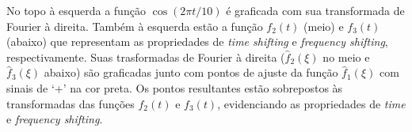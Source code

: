 No topo à esquerda a função $\cos(2 \pi t/10)$ é graficada com sua transformada de Fourier à direita. Também à esquerda estão a função $f_{2}(t)$ (meio) e $f_{3}(t)$ (abaixo) que representam as propriedades de \textit{time shifting} e \textit{frequency shifting}, respectivamente. Suas trasformadas de Fourier à direita ($\hat{f}_{2}(\xi)$ no meio e $\hat{f}_{3}(\xi)$ abaixo) são graficadas junto com pontos de ajuste da função $\hat{f}_{1}(\xi)$ com sinais de `+' na cor preta. Os pontos resultantes estão sobrepostos às transformadas das funções $f_{2}(t)$ e $f_{3}(t)$, evidenciando as propriedades de \textit{time} e \textit{frequency shifting}.








